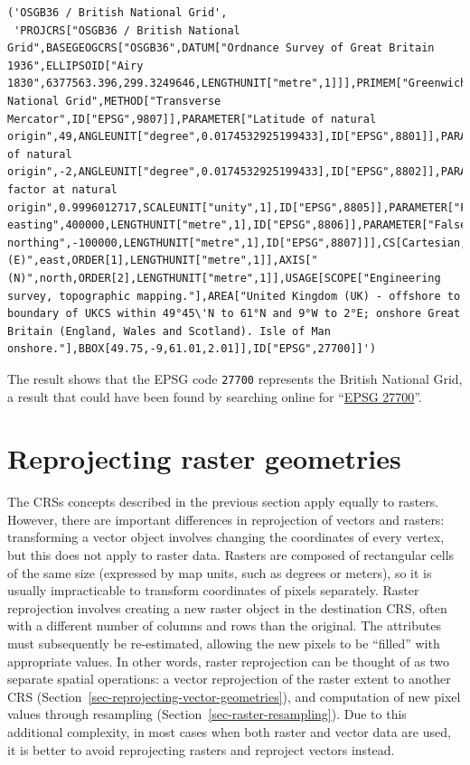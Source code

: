 \documentclass[
  letterpaper,
]{krantz}
\begin{document}
\begin{verbatim}
('OSGB36 / British National Grid',
 'PROJCRS["OSGB36 / British National Grid",BASEGEOGCRS["OSGB36",DATUM["Ordnance Survey of Great Britain 1936",ELLIPSOID["Airy 1830",6377563.396,299.3249646,LENGTHUNIT["metre",1]]],PRIMEM["Greenwich",0,ANGLEUNIT["degree",0.0174532925199433]],ID["EPSG",4277]],CONVERSION["British National Grid",METHOD["Transverse Mercator",ID["EPSG",9807]],PARAMETER["Latitude of natural origin",49,ANGLEUNIT["degree",0.0174532925199433],ID["EPSG",8801]],PARAMETER["Longitude of natural origin",-2,ANGLEUNIT["degree",0.0174532925199433],ID["EPSG",8802]],PARAMETER["Scale factor at natural origin",0.9996012717,SCALEUNIT["unity",1],ID["EPSG",8805]],PARAMETER["False easting",400000,LENGTHUNIT["metre",1],ID["EPSG",8806]],PARAMETER["False northing",-100000,LENGTHUNIT["metre",1],ID["EPSG",8807]]],CS[Cartesian,2],AXIS["(E)",east,ORDER[1],LENGTHUNIT["metre",1]],AXIS["(N)",north,ORDER[2],LENGTHUNIT["metre",1]],USAGE[SCOPE["Engineering survey, topographic mapping."],AREA["United Kingdom (UK) - offshore to boundary of UKCS within 49°45\'N to 61°N and 9°W to 2°E; onshore Great Britain (England, Wales and Scotland). Isle of Man onshore."],BBOX[49.75,-9,61.01,2.01]],ID["EPSG",27700]]')
\end{verbatim}

The result shows that the EPSG code \texttt{27700} represents the
British National Grid, a result that could have been found by searching
online for ``\href{https://www.google.com/search?q=EPSG+27700}{EPSG
27700}''.

\section{Reprojecting raster
geometries}\label{sec-reprojecting-raster-geometries}

The CRSs concepts described in the previous section apply equally to
rasters. However, there are important differences in reprojection of
vectors and rasters: transforming a vector object involves changing the
coordinates of every vertex, but this does not apply to raster data.
Rasters are composed of rectangular cells of the same size (expressed by
map units, such as degrees or meters), so it is usually impracticable to
transform coordinates of pixels separately. Raster reprojection involves
creating a new raster object in the destination CRS, often with a
different number of columns and rows than the original. The attributes
must subsequently be re-estimated, allowing the new pixels to be
``filled'' with appropriate values. In other words, raster reprojection
can be thought of as two separate spatial operations: a vector
reprojection of the raster extent to another CRS
(Section~\ref{sec-reprojecting-vector-geometries}), and computation of
new pixel values through resampling
(Section~\ref{sec-raster-resampling}). Due to this additional
complexity, in most cases when both raster and vector data are used, it
is better to avoid reprojecting rasters and reproject vectors instead.
\end{document}
